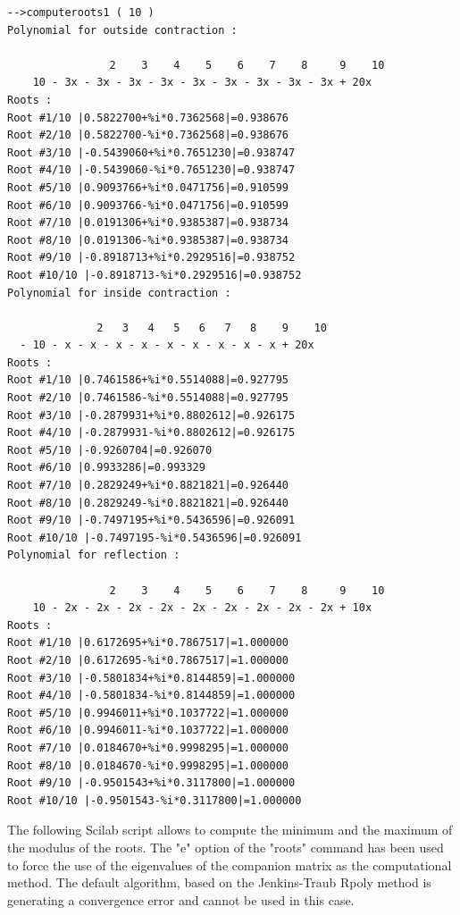 \begin{small}
\begin{verbatim}
-->computeroots1 ( 10 )
Polynomial for outside contraction :
 
                2    3    4    5    6    7    8     9    10  
    10 - 3x - 3x - 3x - 3x - 3x - 3x - 3x - 3x - 3x + 20x    
Roots :
Root #1/10 |0.5822700+%i*0.7362568|=0.938676
Root #2/10 |0.5822700-%i*0.7362568|=0.938676
Root #3/10 |-0.5439060+%i*0.7651230|=0.938747
Root #4/10 |-0.5439060-%i*0.7651230|=0.938747
Root #5/10 |0.9093766+%i*0.0471756|=0.910599
Root #6/10 |0.9093766-%i*0.0471756|=0.910599
Root #7/10 |0.0191306+%i*0.9385387|=0.938734
Root #8/10 |0.0191306-%i*0.9385387|=0.938734
Root #9/10 |-0.8918713+%i*0.2929516|=0.938752
Root #10/10 |-0.8918713-%i*0.2929516|=0.938752
Polynomial for inside contraction :
 
              2   3   4   5   6   7   8    9    10  
  - 10 - x - x - x - x - x - x - x - x - x + 20x    
Roots :
Root #1/10 |0.7461586+%i*0.5514088|=0.927795
Root #2/10 |0.7461586-%i*0.5514088|=0.927795
Root #3/10 |-0.2879931+%i*0.8802612|=0.926175
Root #4/10 |-0.2879931-%i*0.8802612|=0.926175
Root #5/10 |-0.9260704|=0.926070
Root #6/10 |0.9933286|=0.993329
Root #7/10 |0.2829249+%i*0.8821821|=0.926440
Root #8/10 |0.2829249-%i*0.8821821|=0.926440
Root #9/10 |-0.7497195+%i*0.5436596|=0.926091
Root #10/10 |-0.7497195-%i*0.5436596|=0.926091
Polynomial for reflection :
 
                2    3    4    5    6    7    8     9    10  
    10 - 2x - 2x - 2x - 2x - 2x - 2x - 2x - 2x - 2x + 10x    
Roots :
Root #1/10 |0.6172695+%i*0.7867517|=1.000000
Root #2/10 |0.6172695-%i*0.7867517|=1.000000
Root #3/10 |-0.5801834+%i*0.8144859|=1.000000
Root #4/10 |-0.5801834-%i*0.8144859|=1.000000
Root #5/10 |0.9946011+%i*0.1037722|=1.000000
Root #6/10 |0.9946011-%i*0.1037722|=1.000000
Root #7/10 |0.0184670+%i*0.9998295|=1.000000
Root #8/10 |0.0184670-%i*0.9998295|=1.000000
Root #9/10 |-0.9501543+%i*0.3117800|=1.000000
Root #10/10 |-0.9501543-%i*0.3117800|=1.000000
\end{verbatim}
\end{small}

The following Scilab script allows to compute the minimum and 
the maximum of the modulus of the roots. 
The "e" option of the "roots" command has been used to force the 
use of the eigenvalues of the companion matrix as the computational 
method. The default algorithm, based on the Jenkins-Traub Rpoly
method is generating a convergence error and cannot be used 
in this case.

